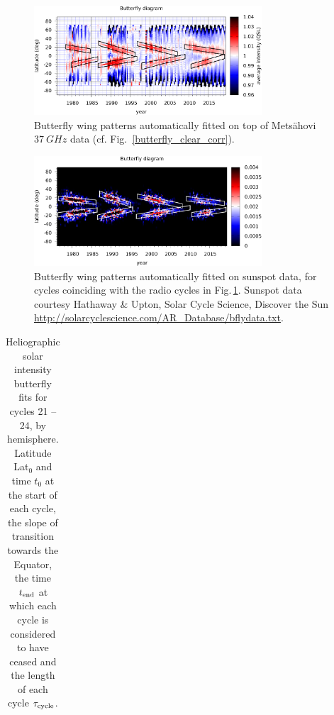 \documentclass{aa}
\begin{document}
\begin{figure}
\centering
\includegraphics[width=8.5cm]{butterfly_wingfit_raw.png}
\caption{Butterfly wing patterns automatically fitted on top of Mets\"ahovi $\SI{37}{GHz}$ data (cf. Fig.~\ref{butterfly_clear_corr}).} 
\label{butterfly_wingfit_raw}
\end{figure}

\begin{figure}
\centering
\includegraphics[width=8.5cm]{butterfly_wingfit_sunspot.png}
\caption{Butterfly wing patterns automatically fitted on sunspot data, for
cycles coinciding with the radio cycles in Fig.\,\ref{butterfly_wingfit_raw}.
Sunspot data courtesy Hathaway \& Upton, Solar Cycle Science,
Discover the Sun\\ 
\href{http://solarcyclescience.com/AR_Database/bflydata.txt}
{http://solarcyclescience.com/AR\_Database/bflydata.txt}.}
\label{butterfly_wingfit_sunspot}
\end{figure}

\begin{table}
\caption{\label{tab:cycles}
Heliographic solar intensity butterfly fits for cycles 21 -- 24, by hemisphere.
Latitude Lat$_0$ and time $t_0$ at the start of each cycle, the slope of transition
towards the Equator, the time $t_{\rm end}$ at which each cycle is considered to have
ceased and the length of each cycle $\tau_{\rm cycle}$.
}
\begin{tabular}{l|ccccr}
\hline\hline

\hline
\end{tabular}
\end{table}
\end{document}
